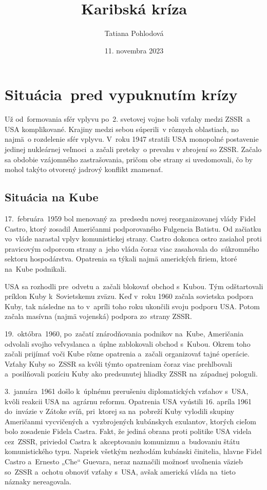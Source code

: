 \documentclass[a4paper]{article}
\title{Karibská kríza}
\author{Tatiana Pohlodová}
\date{11. novembra 2023}
\begin{document}
\shorthandoff{-}
\setcounter{page}{0}


\maketitle

\section{Situácia~pred vypuknutím krízy}
Už od~formovania sfér vplyvu po~2. svetovej vojne boli vzťahy medzi ZSSR~a USA komplikované. Krajiny medzi sebou súperili~v rôznych oblastiach, no najmä~o rozdelenie sfér vplyvu. V~roku 1947 stratili USA monopolné postavenie jedinej nukleárnej veľmoci~a začali preteky~o prevahu v zbrojení so ZSSR. Začalo sa obdobie vzájomného zastrašovania, pričom obe strany si uvedomovali, čo by mohol takýto otvorený jadrový konflikt znamenať.

\subsection{Situácia na Kube}
17.~februára~1959 bol menovaný za~predsedu novej reorganizovanej vlády Fidel Castro, ktorý zosadil Američanmi podporovaného Fulgencia Batistu. Od začiatku vo~vláde narastal vplyv komunistickej strany. \cite{mintomid} Castro dokonca ostro zasiahol proti pravicovým odporcom strany a~jeho vláda čoraz viac zasahovala do~súkromného sektoru hospodárstva. Opatrenia sa týkali najmä amerických firiem, ktoré na~Kube podnikali.

USA sa rozhodli pre~odvetu a~začali blokovať obchod s~Kubou. Tým odštartovali príklon Kuby k~Sovietskemu zväzu. Keď v~roku 1960 začala sovietska podpora Kuby, tak následne na to v~apríli toho roku ukončili svoju podporu USA. Potom začala masívna (najmä vojenská) podpora zo~strany ZSSR.

19.~októbra~1960, po~začatí znárodňovania podnikov na~Kube, Američania odvolali svojho veľvyslanca a~úplne zablokovali obchod s~Kubou. Okrem toho začali prijímať voči Kube rôzne opatrenia a~začali organizovať tajné operácie. Vzťahy Kuby so~ZSSR sa kvôli týmto opatreniam čoraz viac prehlbovali a~posilňovali pozíciu Kuby ako predsunutej hliadky ZSSR na~západnej pologuli. \cite{mintomid}

3.~januára~1961 došlo k~úplnému prerušeniu diplomatických vzťahov s~USA, kvôli reakcii USA na~agrárnu reformu. Opatrenia USA vyústili 16. apríla 1961 do~invázie v Zátoke svíň, pri~ktorej sa na~pobreží Kuby vylodili skupiny Američanmi vycvičených a~vyzbrojených kubánskych exulantov, ktorých cieľom bolo zosadenie Fidela Castra. \cite{13days} Fakt, že jediná obrana proti politike USA videla cez~ZSSR, priviedol Castra k~akceptovaniu komunizmu a~budovaniu štátu komunistického typu. Napriek všetkým nezhodám kubánski činitelia, hlavne Fidel Castro a~Ernesto „Che“ Guevara, neraz naznačili možnosť uvoľnenia väzieb so~ZSSR a~ochotu obnoviť vzťahy s~USA, avšak americká vláda na~tieto náznaky nereagovala.
\end{document}
